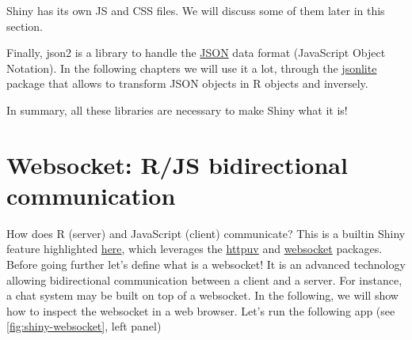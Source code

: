 \documentclass[]{book}
\newenvironment{Shaded}{\begin{snugshade}}{\end{snugshade}}
\newcommand{\ControlFlowTok}[1]{\textcolor[rgb]{0.13,0.29,0.53}{\textbf{#1}}}
\newcommand{\DataTypeTok}[1]{\textcolor[rgb]{0.13,0.29,0.53}{#1}}
\newcommand{\KeywordTok}[1]{\textcolor[rgb]{0.13,0.29,0.53}{\textbf{#1}}}
\newcommand{\NormalTok}[1]{#1}
\newcommand{\OperatorTok}[1]{\textcolor[rgb]{0.81,0.36,0.00}{\textbf{#1}}}
\newcommand{\OtherTok}[1]{\textcolor[rgb]{0.56,0.35,0.01}{#1}}
\newcommand{\StringTok}[1]{\textcolor[rgb]{0.31,0.60,0.02}{#1}}
\begin{document}
Shiny has its own JS and CSS files. We will discuss some of them later in this section.

Finally, json2 is a library to handle the \href{https://www.json.org/json-en.html}{JSON} data format (JavaScript Object Notation). In the following chapters we will use it a lot, through the \href{https://cran.r-project.org/web/packages/jsonlite/index.html}{jsonlite} package that allows to transform JSON objects in R objects and inversely.

In summary, all these libraries are necessary to make Shiny what it is!

\hypertarget{websocket-rjs-bidirectional-communication}{%
\section{Websocket: R/JS bidirectional communication}\label{websocket-rjs-bidirectional-communication}}

How does R (server) and JavaScript (client) communicate? This is a builtin Shiny feature highlighted \href{https://github.com/rstudio/shiny}{here}, which leverages the \href{https://github.com/rstudio/httpuv}{httpuv} and \href{https://github.com/rstudio/websocket}{websocket} packages. Before going further let's define what is a websocket! It is an advanced technology allowing bidirectional communication between a client and a server. For instance, a chat system may be built on top of a websocket. In the following, we will show how to inspect the websocket in a web browser. Let's run the following app (see \ref{fig:shiny-websocket}, left panel)

\begin{Shaded}
\end{Shaded}
\end{document}
